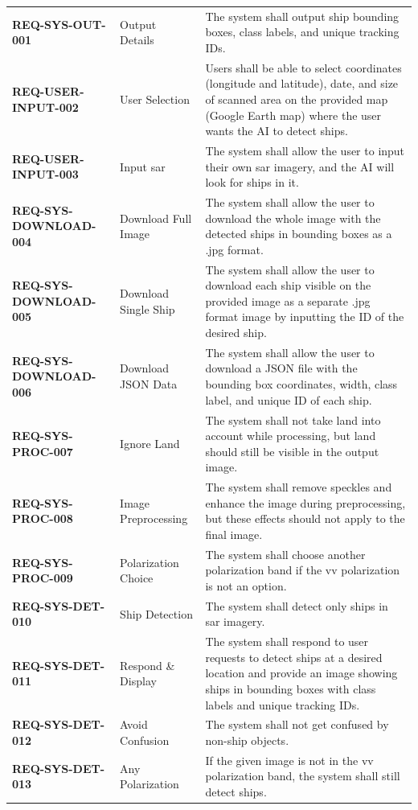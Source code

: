 \documentclass{article}
\begin{document}
\begin{longtable}{>{\bfseries}p{4.5cm}p{3.5cm}p{6.5cm}}
REQ-SYS-OUT-001 & Output Details & The system shall output ship bounding boxes, class labels, and unique tracking IDs. \\
REQ-USER-INPUT-002 & User Selection & Users shall be able to select coordinates (longitude and latitude), date, and size of scanned area on the provided map (Google Earth map) where the user wants the AI to detect ships. \\
REQ-USER-INPUT-003 & Input \acrshort{sar} & The system shall allow the user to input their own \acrshort{sar} imagery, and the AI will look for ships in it. \\
REQ-SYS-DOWNLOAD-004 & Download Full Image & The system shall allow the user to download the whole image with the detected ships in bounding boxes as a .jpg format. \\
REQ-SYS-DOWNLOAD-005 & Download Single Ship & The system shall allow the user to download each ship visible on the provided image as a separate .jpg format image by inputting the ID of the desired ship. \\
REQ-SYS-DOWNLOAD-006 & Download JSON Data & The system shall allow the user to download a JSON file with the bounding box coordinates, width, class label, and unique ID of each ship. \\
REQ-SYS-PROC-007 & Ignore Land & The system shall not take land into account while processing, but land should still be visible in the output image. \\
REQ-SYS-PROC-008 & Image Preprocessing & The system shall remove speckles and enhance the image during preprocessing, but these effects should not apply to the final image. \\
REQ-SYS-PROC-009 & Polarization Choice & The system shall choose another polarization band if the \acrshort{vv} polarization is not an option. \\
REQ-SYS-DET-010 & Ship Detection & The system shall detect only ships in \acrshort{sar} imagery. \\
REQ-SYS-DET-011 & Respond \& Display & The system shall respond to user requests to detect ships at a desired location and provide an image showing ships in bounding boxes with class labels and unique tracking IDs. \\
REQ-SYS-DET-012 & Avoid Confusion & The system shall not get confused by non-ship objects. \\
REQ-SYS-DET-013 & Any Polarization & If the given image is not in the \acrshort{vv} polarization band, the system shall still detect ships. \\

\end{longtable}
\end{document}
